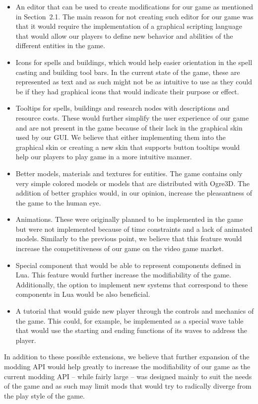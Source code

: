 \begin{itemize}
    \item An editor that can be used to create modifications for our game as mentioned in Section~2.1. The main reason for not creating
        such editor for our game was that it would require the implementation of a graphical scripting language that would allow our
        players to define new behavior and abilities of the different entities in the game.
    \item Icons for spells and buildings, which would help easier orientation in the spell casting and building tool bars. In the current
        state of the game, these are represented as text and as such might not be as intuitive to use as they could be if they had
        graphical icons that would indicate their purpose or effect.
    \item Tooltips for spells, buildings and research nodes with descriptions and resource costs. These would further simplify the user
        experience of our game and are not present in the game because of their lack in the graphical skin used by our GUI. We believe
        that either implementing them into the graphical skin or creating a new skin that supports button tooltips would help our players
        to play game in a more intuitive manner.
    \item Better models, materials and textures for entities. The game contains only very simple colored models or models that are distributed
        with Ogre3D. The addition of better graphics would, in our opinion, increase the pleasantness of the game to the human eye.
    \item Animations. These were originally planned to be implemented in the game but were not implemented because of time constraints
        and a lack of animated models. Similarly to the previous point, we believe that this feature would increase the competitiveness
        of our game on the video game market.
    \item Special component that would be able to represent components defined in Lua. This feature would further increase the modifiability
        of the game. Additionally, the option to implement new systems that correspond to these components in Lua would be also beneficial.
    \item A tutorial that would guide new player through the controls and mechanics of the game. This could, for example, be implemented
        as a special wave table that would use the starting and ending functions of its waves to address the player.
\end{itemize}

In addition to these possible extensions, we believe that further expansion of the modding API would help greatly to increase the
modifiability of our game as the current modding API -- while fairly large -- was designed mainly to suit the needs of the game and as such
may limit mods that would try to radically diverge from the play style of the game.
